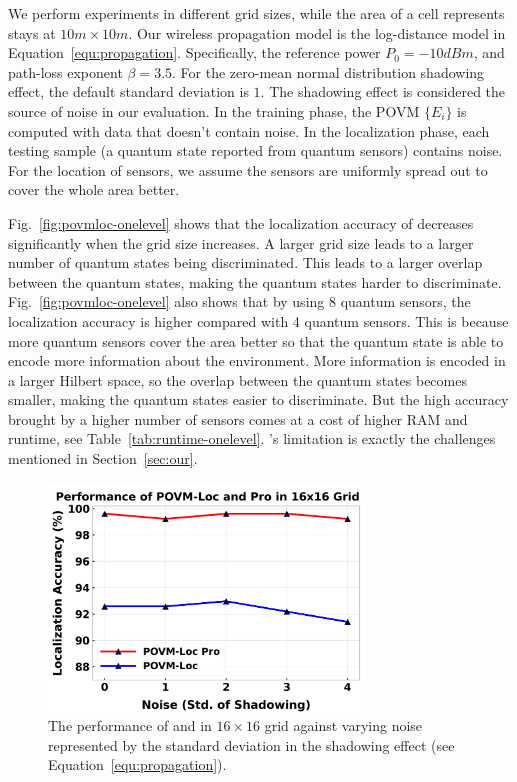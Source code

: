 We perform experiments in different grid sizes, while the area of a cell represents stays at $10m \times 10m$.
Our wireless propagation model is the log-distance model in Equation~\ref{equ:propagation}.
Specifically, the reference power $P_0=-10 dBm$, and path-loss exponent $\beta=3.5$.
For the zero-mean normal distribution shadowing effect, the default standard deviation is $1$.
The shadowing effect is considered the source of noise in our evaluation.
In the training phase, the POVM $\{E_i \}$ is computed with data that doesn't contain noise.
In the localization phase, each testing sample (a quantum state reported from quantum sensors) contains noise.
For the location of sensors, we assume the sensors are uniformly spread out to cover the whole area better.


Fig.~\ref{fig:povmloc-onelevel} shows that the localization accuracy of \povmone decreases significantly when the grid size increases.
A larger grid size leads to a larger number of quantum states being discriminated.
This leads to a larger overlap between the quantum states, making the quantum states harder to discriminate.
Fig.~\ref{fig:povmloc-onelevel} also shows that by using 8 quantum sensors, the localization accuracy is higher compared with 4 quantum sensors.
This is because more quantum sensors cover the area better so that the quantum state is able to encode more information about the environment.
More information is encoded in a larger Hilbert space, so the overlap between the quantum states becomes smaller, making the quantum states easier to discriminate.
But the high accuracy brought by a higher number of sensors comes at a cost of higher RAM and runtime, see Table~\ref{tab:runtime-onelevel}.
\povmone's limitation is exactly the challenges mentioned in Section~\ref{sec:our}.




\begin{figure}[t]
    \centering
    \includegraphics[width=0.75\textwidth]{chapters/icc/figures/twolevel-varynoise.png}
    \caption{The performance of \povm and \povmpro in $16\times 16$ grid against varying noise represented by the standard deviation in the shadowing effect (see Equation~\ref{equ:propagation}).}
    \label{fig:povmloc}
\end{figure}


